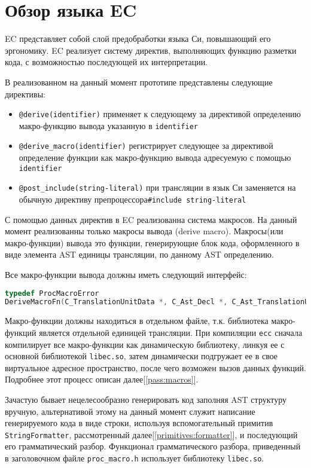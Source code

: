 \section{Обзор языка EC}

EC представляет собой слой предобработки языка Си, повышающий его эргономику.
EC реализует систему директив, выполняющих функцию разметки кода, с возможностью последующей их интерпретации.

В реализованном на данный момент прототипе представлены следующие директивы:
\begin{itemize}
\item \verb|@derive(identifier)| применяет к следующему за директивой определению макро-функцию вывода указанную в \verb|identifier|
\item \verb|@derive_macro(identifier)| регистрирует следующее за директивой определение функции как макро-функцию вывода адресуемую с помощью \verb|identifier|
\item \verb|@post_include(string-literal)| при трансляции в язык Си заменяется на обычную директиву препроцессора\break \verb|#include string-literal|
\end{itemize}

С помощью данных директив в EC реализованна система макросов. На данный момент реализованны только макросы вывода (derive macro).
Макросы(или макро-функции) вывода это функции, генерирующие блок кода, оформленного в виде элемента AST единицы трансляции, по данному AST определению.

Все макро-функции вывода должны иметь следующий интерфейс:
\begin{lstlisting}[language=C]
typedef ProcMacroError
DeriveMacroFn(C_TranslationUnitData *, C_Ast_Decl *, C_Ast_TranslationUnit **);
\end{lstlisting}

Макро-функции должны находиться в отдельном файле, т.к. библиотека макро-функций является отдельной единицей трансляции.
При компиляции \verb|ecc| сначала компилирует все макро-функции как динамическую библиотеку, линкуя ее с основной библиотекой \verb|libec.so|, затем динамически подгружает ее в свое виртуальное адресное пространство, после чего возможен вызов данных функций.
Подробнее этот процесс описан далее[\ref{pass:macros}].

Зачастую бывает нецелесообразно генерировать код заполняя AST структуру вручную, альтернативой этому на данный момент служит написание генерируемого кода в виде строки,
используя вспомогательный примитив \verb|StringFormatter|, рассмотренный далее[\ref{primitives:formatter}], и последующий его грамматический разбор.
Функционал грамматического разбора, приведенный в заголовочном файле \verb|proc_macro.h| использует библиотеку \verb|libec.so|.

